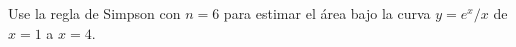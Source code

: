 \item Use la regla de Simpson con $n = 6$ para estimar el área bajo la curva $y = e^x/x$ de $x = 1$ a $x = 4$.

